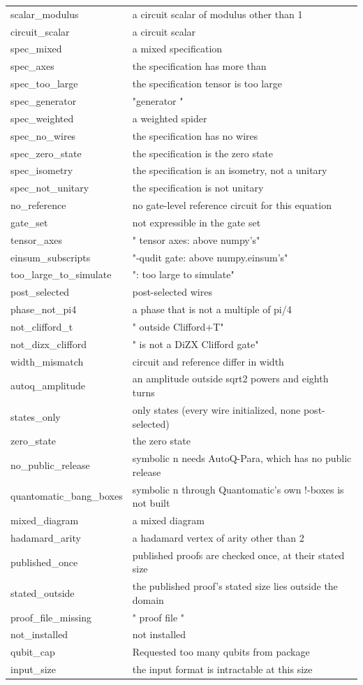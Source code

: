 \begin{xltabular}{\textwidth}{@{}>{\ttfamily}p{0.3\textwidth} >{\ttfamily}X@{}}
scalar\_modulus & a circuit scalar of modulus other than 1\\
circuit\_scalar & a circuit scalar\\
spec\_mixed & a mixed specification\\
spec\_axes & the specification has more than\\
spec\_too\_large & the specification tensor is too large\\
spec\_generator & "generator "\\
spec\_weighted & a weighted spider\\
spec\_no\_wires & the specification has no wires\\
spec\_zero\_state & the specification is the zero state\\
spec\_isometry & the specification is an isometry, not a unitary\\
spec\_not\_unitary & the specification is not unitary\\
no\_reference & no gate-level reference circuit for this equation\\
gate\_set & not expressible in the gate set\\
tensor\_axes & " tensor axes: above numpy's"\\
einsum\_subscripts & "-qudit gate: above numpy.einsum's"\\
too\_large\_to\_simulate & ": too large to simulate"\\
post\_selected & post-selected wires\\
phase\_not\_pi4 & a phase that is not a multiple of pi/4\\
not\_clifford\_t & " outside Clifford+T"\\
not\_dizx\_clifford & " is not a DiZX Clifford gate"\\
width\_mismatch & circuit and reference differ in width\\
autoq\_amplitude & an amplitude outside sqrt2 powers and eighth turns\\
states\_only & only states (every wire initialized, none post-selected)\\
zero\_state & the zero state\\
no\_public\_release & symbolic n needs AutoQ-Para, which has no public release\\
quantomatic\_bang\_boxes & symbolic n through Quantomatic's own !-boxes is not built\\
mixed\_diagram & a mixed diagram\\
hadamard\_arity & a hadamard vertex of arity other than 2\\
published\_once & published proofs are checked once, at their stated size\\
stated\_outside & the published proof's stated size lies outside the domain\\
proof\_file\_missing & " proof file "\\
not\_installed & not installed\\
qubit\_cap & Requested too many qubits from package\\
input\_size & the input format is intractable at this size\\
\end{xltabular}

